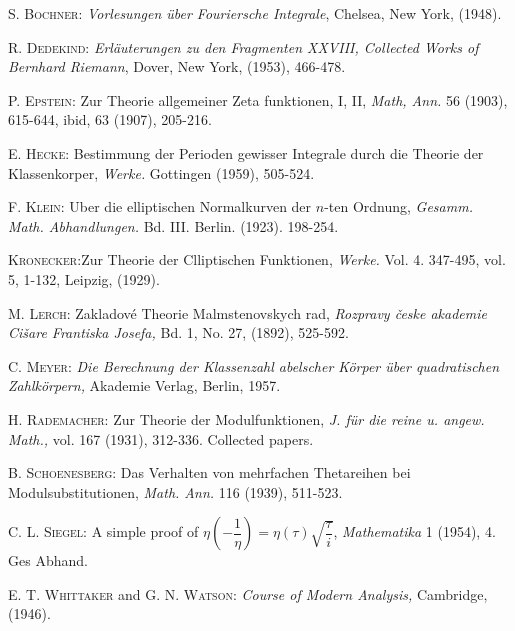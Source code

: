 \begin{thebibliography}{99}
 \textsc{S. Bochner:} {\em Vorlesungen \"uber Fouriersche
  Integrale}, Chelsea, New York, (1948).

 \textsc{R. Dedekind:} {\em Erl\"auterungen zu den
  Fragmenten XXVIII, Collected Works of Bernhard Riemann}, Dover, New
  York, (1953), 466-478.

 \textsc{P. Epstein:} Zur Theorie allgemeiner Zeta
  funktionen, I, II, {\em Math, Ann.} 56 (1903), 615-644, ibid, 63
  (1907), 205-216.

 \textsc{E. Hecke:} Bestimmung der Perioden gewisser
  Integrale durch die Theorie der Klassenkorper, {\em Werke.}
  Gottingen (1959), 505-524.

 \textsc{F. Klein:} Uber die elliptischen Normalkurven der
  $n$-ten Ordnung, {\em Gesamm. Math. Abhandlungen.}
  Bd. III. Berlin. (1923). 198-254.

 \textsc{Kronecker:}\pageoriginale Zur Theorie der Clliptischen
  Funktionen, {\em Werke.} Vol. 4. 347-495, vol. 5, 1-132, Leipzig,
  (1929).

 \textsc{M. Lerch:} Zakladov\'e Theorie Malmstenovskych
  rad, {\em Rozpravy \v{c}eske akademie Ci\v{s}are Frantiska Josefa,}
  Bd. 1, No. 27, (1892), 525-592.

 \textsc{C. Meyer:} {\em Die Berechnung der Klassenzahl
  abelscher K\"orper \"uber quadratischen Zahlk\"orpern,} Akademie
  Verlag, Berlin, 1957.

 \textsc{H. Rademacher:} Zur Theorie der Modulfunktionen,
  {\em J. f\"ur die reine u. angew. Math.,} vol. 167 (1931),
  312-336. Collected papers.

 \textsc{B. Schoenesberg:} Das Verhalten von mehrfachen
  Thetareihen bei Modulsubstitutionen, {\em Math. Ann.} 116 (1939),
  511-523.

 \textsc{C. L. Siegel:} A simple proof of
  $\eta\left(-\dfrac{1}{\eta}\right)=\eta(\tau)\sqrt{\dfrac{\tau}{i}}$,
  {\em Mathematika} 1 (1954), 4. Ges Abhand.

 \textsc{E. T. Whittaker} and \textsc{G. N. Watson:} {\em
  Course of Modern Analysis,} Cambridge, (1946).  
\end{thebibliography}
